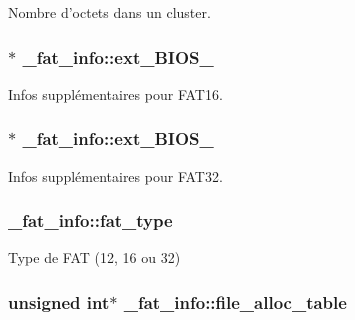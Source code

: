 Nombre d'octets dans un cluster. \hypertarget{struct__fat__info_a4da4c2a7a629ca59a686822e6447acb8}{
\subsubsection[{ext\-\_\-\-B\-I\-O\-S\-\_\-16}]{$\ast$ \-\_\-fat\-\_\-info\-::ext\-\_\-\-B\-I\-O\-S\-\_}}\label{struct__fat__info_a4da4c2a7a629ca59a686822e6447acb8}
Infos supplémentaires pour F\-A\-T16. \hypertarget{struct__fat__info_aab203e7eb3c2027e3034d7765a2d5281}{
\subsubsection[{ext\-\_\-\-B\-I\-O\-S\-\_\-32}]{$\ast$ \-\_\-fat\-\_\-info\-::ext\-\_\-\-B\-I\-O\-S\-\_}}\label{struct__fat__info_aab203e7eb3c2027e3034d7765a2d5281}
Infos supplémentaires pour F\-A\-T32. \hypertarget{struct__fat__info_af9e994d6d2c5211614ca61cfa4492500}{
\subsubsection[{fat\-\_\-type}]{ \-\_\-fat\-\_\-info\-::fat\-\_\-type}}\label{struct__fat__info_af9e994d6d2c5211614ca61cfa4492500}
Type de F\-A\-T (12, 16 ou 32) \hypertarget{struct__fat__info_a27195d09eb1dcd65d35d7b312d1bec0b}{
\subsubsection[{file\-\_\-alloc\-\_\-table}]{\setlength{\rightskip}{0pt plus 5cm}unsigned int$\ast$ \-\_\-fat\-\_\-info\-::file\-\_\-alloc\-\_\-table}}\label{struct__fat__info_a27195d09eb1dcd65d35d7b312d1bec0b}
